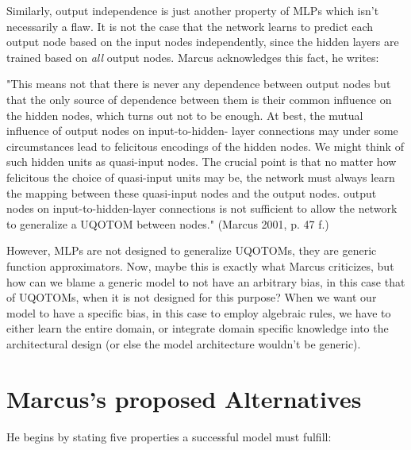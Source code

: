 \documentclass[../../main.tex]{subfiles}
\begin{document}
\begin{critique}
    Similarly, output independence is just another property of MLPs which isn't necessarily a flaw. It is not the case that the network learns to predict each output node based on the input nodes independently, since the hidden layers are trained based on \emph{all} output nodes.
    Marcus acknowledges this fact, he writes:

    "This means not that there is never any dependence between output
    nodes but that the only source of dependence between them is their common influence on the hidden nodes, which turns out not to be enough.
    At best, the mutual influence of output nodes on input-to-hidden-
    layer connections may under some circumstances lead to felicitous
    encodings of the hidden nodes. We might think of such hidden units
    as quasi-input nodes. The crucial point is that no matter how felicitous
    the choice of quasi-input units may be, the network must always learn
    the mapping between these quasi-input nodes and the output nodes.
    output nodes on input-to-hidden-layer connections is not sufficient
    to allow the network to generalize a UQOTOM between nodes." (Marcus 2001, p. 47 f.)

    However, MLPs are not designed to generalize UQOTOMs, they are generic function approximators. Now, maybe this is exactly what Marcus criticizes, but how can we blame a generic model to not have an arbitrary bias, in this case that of UQOTOMs, when it is not designed for this purpose? When we want our model to have a specific bias, in this case to employ algebraic rules, we have to either learn the entire domain, or integrate domain specific knowledge into the architectural design (or else the model architecture wouldn't be generic).
\end{critique}

\section{Marcus's proposed Alternatives}
He begins by stating five properties a successful model must fulfill:
\end{document}
